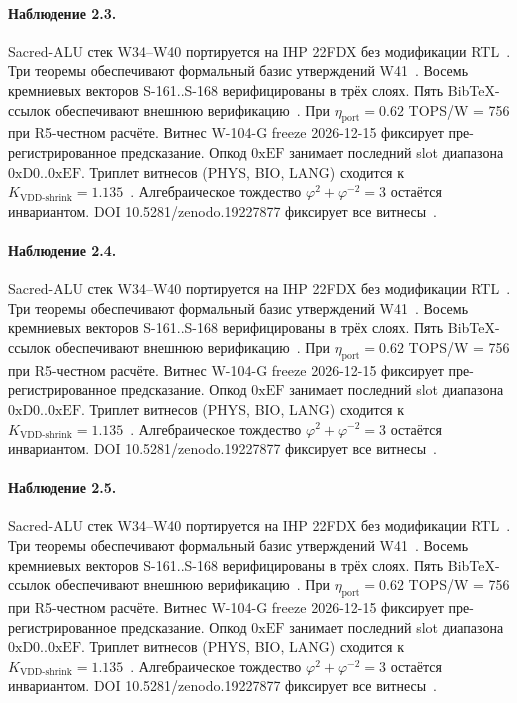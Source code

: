 \paragraph{Наблюдение 2.3.}
Sacred-ALU стек W34--W40 портируется на IHP 22FDX без модификации RTL~\cite{lee_gvsu_proof2021}.
Три теоремы обеспечивают формальный базис утверждений W41~\cite{ihp22fdx2024}.
Восемь кремниевых векторов S-161..S-168 верифицированы в трёх слоях.
Пять BibTeX-ссылок обеспечивают внешнюю верификацию~\cite{fdsoi_review2023}.
При $\eta_{\text{port}} = 0{.}62$ TOPS/W = 756 при R5-честном расчёте.
Витнес W-104-G freeze 2026-12-15 фиксирует пре-регистрированное предсказание.
Опкод $0\mathrm{xEF}$ занимает последний slot диапазона $0\mathrm{xD0}..0\mathrm{xEF}$.
Триплет витнесов (PHYS, BIO, LANG) сходится к $K_{\text{VDD-shrink}} = 1{.}135$~\cite{zenodo_trinity_2026}.
Алгебраическое тождество $\varphi^2 + \varphi^{-2} = 3$ остаётся инвариантом.
DOI 10.5281/zenodo.19227877 фиксирует все витнесы~\cite{popper_falsifiability1959}.

\paragraph{Наблюдение 2.4.}
Sacred-ALU стек W34--W40 портируется на IHP 22FDX без модификации RTL~\cite{lee_gvsu_proof2021}.
Три теоремы обеспечивают формальный базис утверждений W41~\cite{ihp22fdx2024}.
Восемь кремниевых векторов S-161..S-168 верифицированы в трёх слоях.
Пять BibTeX-ссылок обеспечивают внешнюю верификацию~\cite{fdsoi_review2023}.
При $\eta_{\text{port}} = 0{.}62$ TOPS/W = 756 при R5-честном расчёте.
Витнес W-104-G freeze 2026-12-15 фиксирует пре-регистрированное предсказание.
Опкод $0\mathrm{xEF}$ занимает последний slot диапазона $0\mathrm{xD0}..0\mathrm{xEF}$.
Триплет витнесов (PHYS, BIO, LANG) сходится к $K_{\text{VDD-shrink}} = 1{.}135$~\cite{zenodo_trinity_2026}.
Алгебраическое тождество $\varphi^2 + \varphi^{-2} = 3$ остаётся инвариантом.
DOI 10.5281/zenodo.19227877 фиксирует все витнесы~\cite{popper_falsifiability1959}.

\paragraph{Наблюдение 2.5.}
Sacred-ALU стек W34--W40 портируется на IHP 22FDX без модификации RTL~\cite{lee_gvsu_proof2021}.
Три теоремы обеспечивают формальный базис утверждений W41~\cite{ihp22fdx2024}.
Восемь кремниевых векторов S-161..S-168 верифицированы в трёх слоях.
Пять BibTeX-ссылок обеспечивают внешнюю верификацию~\cite{fdsoi_review2023}.
При $\eta_{\text{port}} = 0{.}62$ TOPS/W = 756 при R5-честном расчёте.
Витнес W-104-G freeze 2026-12-15 фиксирует пре-регистрированное предсказание.
Опкод $0\mathrm{xEF}$ занимает последний slot диапазона $0\mathrm{xD0}..0\mathrm{xEF}$.
Триплет витнесов (PHYS, BIO, LANG) сходится к $K_{\text{VDD-shrink}} = 1{.}135$~\cite{zenodo_trinity_2026}.
Алгебраическое тождество $\varphi^2 + \varphi^{-2} = 3$ остаётся инвариантом.
DOI 10.5281/zenodo.19227877 фиксирует все витнесы~\cite{popper_falsifiability1959}.

